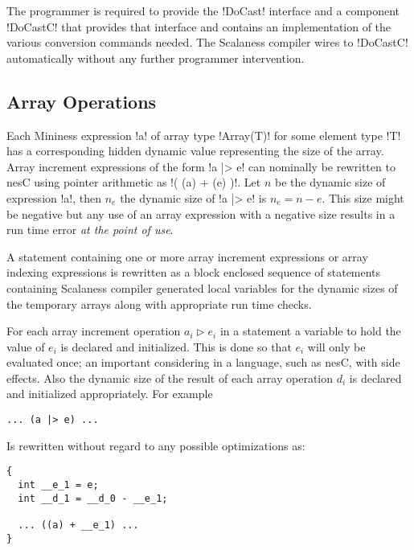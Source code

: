 The programmer is required to provide the !DoCast! interface and a component !DoCastC! that
provides that interface and contains an implementation of the various conversion commands
needed. The Scalaness compiler wires to !DoCastC! automatically without any further programmer
intervention.


\subsection{Array Operations}
\label{section-array-operations}

Each Mininess expression !a! of array type !Array(T)! for some element type !T! has a
corresponding hidden dynamic value representing the size of the array. Array increment
expressions of the form !a |> e! can nominally be rewritten to nesC using pointer arithmetic as
!( (a) + (e) )!. Let $n$ be the dynamic size of expression !a!, then $n_e$ the dynamic size of
!a |> e! is $n_e = n - e$. This size might be negative but any use of an array expression with a
negative size results in a run time error \emph{at the point of use}.

A statement containing one or more array increment expressions or array indexing expressions is
rewritten as a block enclosed sequence of statements containing Scalaness compiler generated
local variables for the dynamic sizes of the temporary arrays along with appropriate run time
checks.

For each array increment operation $a_i \rhd e_i$ in a statement a variable to hold the value of
$e_i$ is declared and initialized. This is done so that $e_i$ will only be evaluated once; an
important considering in a language, such as nesC, with side effects. Also the dynamic size of
the result of each array operation $d_i$ is declared and initialized appropriately. For example

\singlespace
\begin{lstlisting}[language=nesC]
... (a |> e) ...
\end{lstlisting}
\primaryspacing

Is rewritten without regard to any possible optimizations as:

\singlespace
\begin{lstlisting}[language=nesC]
{
  int __e_1 = e;
  int __d_1 = __d_0 - __e_1;

  ... ((a) + __e_1) ...
}
\end{lstlisting}
\primaryspacing

